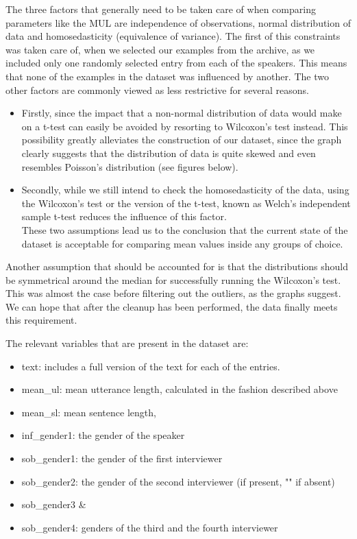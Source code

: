 \documentclass[
]{article}
\providecommand{\tightlist}{%
  \setlength{\itemsep}{0pt}\setlength{\parskip}{0pt}}
\begin{document}
The three factors that generally need to be taken care of when comparing
parameters like the MUL are independence of observations, normal
distribution of data and homosedasticity (equivalence of variance). The
first of this constraints was taken care of, when we selected our
examples from the archive, as we included only one randomly selected
entry from each of the speakers. This means that none of the examples in
the dataset was influenced by another. The two other factors are
commonly viewed as less restrictive for several reasons.

\begin{itemize}
\tightlist
\item
  Firstly, since the impact that a non-normal distribution of data would
  make on a t-test can easily be avoided by resorting to Wilcoxon's test
  instead. This possibility greatly alleviates the construction of our
  dataset, since the graph clearly suggests that the distribution of
  data is quite skewed and even resembles Poisson's distribution (see
  figures below).
\item
  Secondly, while we still intend to check the homosedasticity of the
  data, using the Wilcoxon's test or the version of the t-test, known as
  Welch's independent sample t-test reduces the influence of this
  factor.\\
  These two assumptions lead us to the conclusion that the current state
  of the dataset is acceptable for comparing mean values inside any
  groups of choice.
\end{itemize}

Another assumption that should be accounted for is that the
distributions should be symmetrical around the median for successfully
running the Wilcoxon's test. This was almost the case before filtering
out the outliers, as the graphs suggest. We can hope that after the
cleanup has been performed, the data finally meets this requirement.

The relevant variables that are present in the dataset are:

\begin{itemize}
\tightlist
\item
  text: includes a full version of the text for each of the entries.
\item
  mean\_ul: mean utterance length, calculated in the fashion described
  above
\item
  mean\_sl: mean sentence length,
\item
  inf\_gender1: the gender of the speaker
\item
  sob\_gender1: the gender of the first interviewer
\item
  sob\_gender2: the gender of the second interviewer (if present, "" if
  absent)
\item
  sob\_gender3 \&
\item
  sob\_gender4: genders of the third and the fourth interviewer
\end{itemize}
\end{document}
